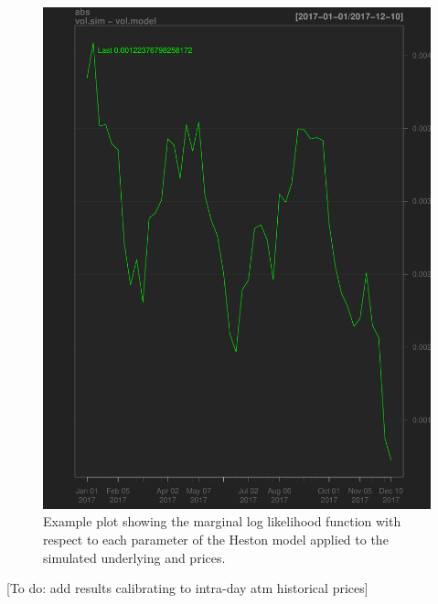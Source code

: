 \documentclass{article}
\begin{document}
\begin{figure}
\includegraphics[scale=0.8]{../figures/vol_error.pdf}
\caption{Example plot showing the marginal log likelihood function with respect to each parameter of the Heston model applied to the simulated underlying and prices.}
\end{figure}



[To do: add results calibrating to intra-day atm historical prices]

\clearpage

\appendix
\end{document}
